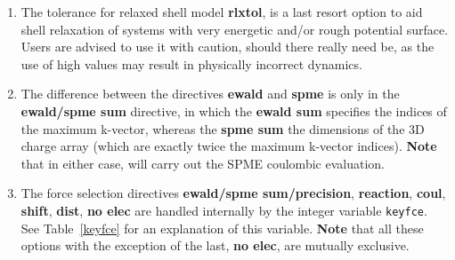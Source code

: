 \begin{enumerate}
\item The tolerance for relaxed shell model {\bf rlxtol}, is a last
resort option to aid shell relaxation of systems with very energetic
and/or rough potential surface.  Users are advised to use it with
caution, should there really need be, as the use of high values may
result in physically incorrect dynamics.

\item The difference between the directives {\bf ewald} and {\bf spme}
is only in the {\bf ewald/spme sum} directive, in which the
{\bf ewald sum} specifies the indices of the maximum k-vector, whereas
the {\bf spme sum} the dimensions of the 3D charge array
(which are exactly twice the maximum k-vector indices).  {\bf Note}
that in either case, \D will carry out the
SPME coulombic evaluation.

\item The force selection directives
{\bf ewald/spme sum/precision},
{\bf reaction}, {\bf coul}, {\bf shift}, {\bf dist}, {\bf no elec}
are handled internally by the integer variable {\tt keyfce}.
See Table~\ref{keyfce} for an explanation of this variable.
{\bf Note} that all these options with the exception of the last,
{\bf no elec}, are mutually exclusive.

\begin{table}[htbp]
\end{table}


\end{enumerate}
